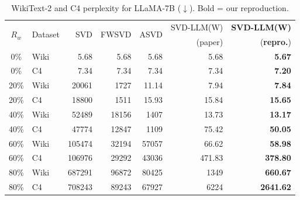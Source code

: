 \documentclass[11pt,a4paper]{article}
\theoremstyle{remark}
\begin{document}
\begin{table}[H]
\centering
\caption{WikiText-2 and C4 perplexity for LLaMA-7B ($\downarrow$).
         Bold = our reproduction.}
\label{tab:ppl}
\small
\setlength{\tabcolsep}{4pt}
\begin{tabular}{@{}cl rrrr r@{}}
\toprule
\multirow{2}{*}{$R_w$} & \multirow{2}{*}{Dataset}
  & \multirow{2}{*}{SVD} & \multirow{2}{*}{FWSVD} & \multirow{2}{*}{ASVD}
  & {SVD-LLM(W)} & {\textbf{SVD-LLM(W)}} \\
  & & & & & {(paper)} & {(\textbf{repro.})} \\
\midrule
0\%  & Wiki &   5.68 &   5.68 &   5.68 &    5.68 & \textbf{5.67} \\
0\%  & C4   &   7.34 &   7.34 &   7.34 &    7.34 & \textbf{7.20} \\
\midrule
20\% & Wiki & 20061 &   1727 &  11.14 &    7.94 & \textbf{7.84} \\
20\% & C4   & 18800 &   1511 &  15.93 &   15.84 & \textbf{15.65} \\
\midrule
40\% & Wiki & 52489 &  18156 &   1407 &   13.73 & \textbf{13.17} \\
40\% & C4   & 47774 &  12847 &   1109 &   75.42 & \textbf{50.05} \\
\midrule
60\% & Wiki & 105474 & 32194 & 57057 &   66.62 & \textbf{58.98} \\
60\% & C4   & 106976 & 29292 & 43036 &  471.83 & \textbf{378.80} \\
\midrule
80\% & Wiki & 687291 & 96872 & 80425 &   1349 & \textbf{660.67} \\
80\% & C4   & 708243 & 89243 & 67927 &   6224 & \textbf{2641.62} \\
\bottomrule
\end{tabular}
\end{table}
\end{document}

